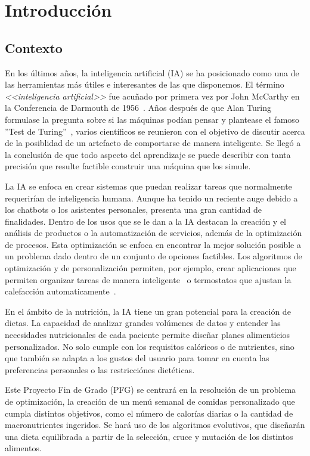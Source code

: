 \chapter{Introducción}
\label{ch:introduccion}

\section{Contexto}
En los últimos años, la inteligencia artificial (IA) se ha posicionado como una de las herramientas más útiles e interesantes de las que disponemos. El término \textit{<<inteligencia artificial>>} fue acuñado por primera vez por John McCarthy en la Conferencia de Darmouth de 1956~\cite{dartmouth1956}. Años después de que Alan Turing formulase la pregunta sobre si las máquinas podían pensar y plantease el famoso ''Test de Turing''~\cite{turing1950}, varios científicos se reunieron con el objetivo de discutir acerca de la posiblidad de un artefacto de comportarse de manera inteligente. Se llegó a la conclusión de que todo aspecto del aprendizaje se puede describir con tanta precisión que resulte factible construir una máquina que los simule.

La IA se enfoca en crear sistemas que puedan realizar tareas que normalmente requerirían de inteligencia humana. Aunque ha tenido un reciente auge debido a los chatbots o los asistentes personales, presenta una gran cantidad de finalidades. Dentro de los usos que se le dan a la IA destacan la creación y el análisis de productos o la automatización de servicios, además de la optimización de procesos. Esta optimización se enfoca en encontrar la mejor solución posible a un problema dado dentro de un conjunto de opciones factibles. Los algoritmos de optimización y de personalización permiten, por ejemplo, crear aplicaciones que permiten organizar tareas de manera inteligente~\cite{todoist2024} o termostatos que ajustan la calefacción automaticamente~\cite{googlenest2020}.

En el ámbito de la nutrición, la IA tiene un gran potencial para la creación de dietas. La capacidad de analizar grandes volúmenes de datos y entender las necesidades nutricionales de cada paciente permite diseñar planes alimenticios personalizados. No solo cumple con los requisitos calóricos o de nutrientes, sino que también se adapta a los gustos del usuario para tomar en cuenta las preferencias personales o las restricciónes dietéticas.

Este Proyecto Fin de Grado (PFG) se centrará en la resolución de un problema de optimización, la creación de un menú semanal de comidas personalizado que cumpla distintos objetivos, como el número de calorías diarias o la cantidad de macronutrientes ingeridos. Se hará uso de los algoritmos evolutivos, que diseñarán una dieta equilibrada a partir de la selección, cruce y mutación de los distintos alimentos.


